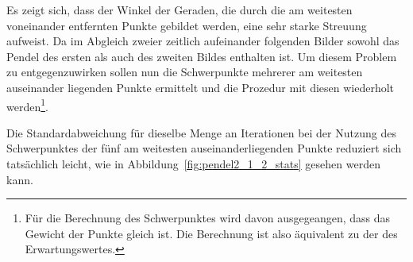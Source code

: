 Es zeigt sich, dass der Winkel der Geraden, die durch die am weitesten voneinander entfernten Punkte gebildet werden, eine sehr starke Streuung aufweist.
Da im Abgleich zweier zeitlich aufeinander folgenden Bilder sowohl das Pendel des ersten als auch des zweiten Bildes enthalten ist.
Um diesem Problem zu entgegenzuwirken sollen nun die Schwerpunkte mehrerer am weitesten auseinander liegenden Punkte ermittelt und die Prozedur mit diesen wiederholt werden\footnote{Für die Berechnung des Schwerpunktes wird davon ausgegeangen, dass das Gewicht der Punkte gleich ist. Die Berechnung ist also äquivalent zu der des Erwartungswertes.}.

Die Standardabweichung für dieselbe Menge an Iterationen bei der Nutzung des Schwerpunktes der fünf am weitesten auseinanderliegenden Punkte reduziert sich tatsächlich leicht, wie in Abbildung~\ref{fig:pendel2_1_2_stats} gesehen werden kann.

